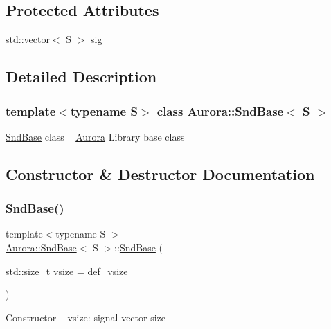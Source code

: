 \subsection*{Protected Attributes}
\begin{DoxyCompactItemize}
\item 
std\+::vector$<$ S $>$ \hyperlink{class_aurora_1_1_snd_base_adad6cd3430a1510dc887cc6bd1a45658}{sig}
\end{DoxyCompactItemize}


\subsection{Detailed Description}
\subsubsection*{template$<$typename S$>$\newline
class Aurora\+::\+Snd\+Base$<$ S $>$}

\hyperlink{class_aurora_1_1_snd_base}{Snd\+Base} class ~\newline
\hyperlink{namespace_aurora}{Aurora} Library base class 

\subsection{Constructor \& Destructor Documentation}
\mbox{\label{class_aurora_1_1_snd_base_a960739d3ae63df581c28f8801e589a3c}} 
\subsubsection{\texorpdfstring{Snd\+Base()}{SndBase()}}
{\footnotesize\ttfamily template$<$typename S $>$ \\
\hyperlink{class_aurora_1_1_snd_base}{Aurora\+::\+Snd\+Base}$<$ S $>$\+::\hyperlink{class_aurora_1_1_snd_base}{Snd\+Base} (\begin{DoxyParamCaption}\item[{std\+::size\+\_\+t}]{vsize = {\ttfamily \hyperlink{namespace_aurora_afaaddf667a06e7ce23c667a8b7295263}{def\+\_\+vsize}} }\end{DoxyParamCaption})\hspace{0.3cm}{\ttfamily [inline]}}

Constructor ~\newline
vsize\+: signal vector size 

